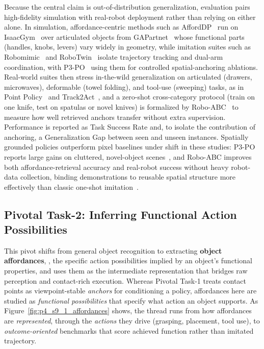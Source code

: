 Because the central claim is out-of-distribution generalization, evaluation pairs high-fidelity simulation with real-robot deployment rather than relying on either alone. In simulation, affordance-centric methods such as AffordDP~\cite{wu2025afforddpgeneralizablediffusionpolicy} run on IsaacGym~\cite{makoviychuk2021isaac} over articulated objects from GAPartnet~\cite{geng2023gapartnet} whose functional parts (handles, knobs, levers) vary widely in geometry, while imitation suites such as Robomimic~\cite{robomimic2021} and RoboTwin~\cite{mu2024robotwin} isolate trajectory tracking and dual-arm coordination, with P3-PO~\cite{levy2024p3poprescriptivepointpriors} using them for controlled spatial-anchoring ablations. Real-world suites then stress in-the-wild generalization on articulated (drawers, microwaves), deformable (towel folding), and tool-use (sweeping) tasks, as in Point Policy~\cite{haldar2025pointpolicyunifyingobservations} and Track2Act~\cite{bharadhwaj2024track2act}, and a zero-shot cross-category protocol (train on one knife, test on spatulas or novel knives) is formalized by Robo-ABC~\cite{ju2024roboabcaffordancegeneralizationcategories} to measure how well retrieved anchors transfer without extra supervision. Performance is reported as Task Success Rate and, to isolate the contribution of anchoring, a Generalization Gap between seen and unseen instances. Spatially grounded policies outperform pixel baselines under shift in these studies: P3-PO reports large gains on cluttered, novel-object scenes~\cite{levy2024p3poprescriptivepointpriors}, and Robo-ABC improves both affordance-retrieval accuracy and real-robot success without heavy robot-data collection, binding demonstrations to reusable spatial structure more effectively than classic one-shot imitation~\cite{duan2017oneshotimitationlearning}.


\subsection{Pivotal Task-2: Inferring Functional Action Possibilities}
\label{subsec:p4-sec9-1-pivotal-task-2-inferring-functional-action-possibilities}

This pivot shifts from general object recognition to extracting \textbf{object affordances}, \ie, the specific action possibilities implied by an object's functional properties, and uses them as the intermediate representation that bridges raw perception and contact-rich execution. Whereas Pivotal Task-1 treats contact points as viewpoint-stable \emph{anchors} for conditioning a policy, affordances here are studied as \emph{functional possibilities} that specify what action an object supports. As Figure~\ref{fig:p4_s9_1_affordances} shows, the thread runs from how affordances are \emph{represented}, through the \emph{actions} they drive (grasping, placement, tool use), to \emph{outcome-oriented} benchmarks that score achieved function rather than imitated trajectory.

